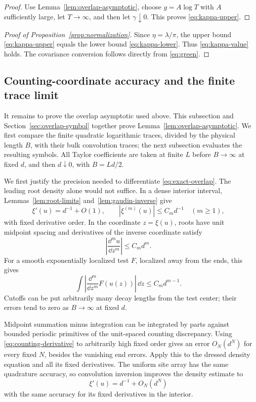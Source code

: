 \begin{proof}
Use Lemma~\ref{lem:overlap-asymptotic}, choose
\(g=A\log T\) with \(A\) sufficiently large, let \(T\to\infty\), and
then let \(\gamma\downarrow0\). This proves
\eqref{eq:kappa-upper}.
\end{proof}

\begin{proof}[Proof of Proposition~\ref{prop:normalization}]
Since \(\eta=\lambda/\pi\), the upper bound
\eqref{eq:kappa-upper} equals the lower bound
\eqref{eq:kappa-lower}. Thus \eqref{eq:kappa-value} holds.
The covariance conversion follows directly from \eqref{eq:green}.
\end{proof}

\subsection{Counting-coordinate accuracy and the finite trace limit}
\label{sec:finite-trace}

It remains to prove the overlap asymptotic used above. This subsection
and Section~\ref{sec:overlap-symbol} together prove
Lemma~\ref{lem:overlap-asymptotic}. We first compare the finite quadratic
logarithmic traces, divided by the physical length \(B\), with their bulk
convolution traces; the next subsection evaluates the resulting symbols.
All Taylor coefficients are taken at finite \(L\) before \(B\to\infty\)
at fixed \(d\), and then \(d\downarrow0\), with \(B=Ld/2\).

We first justify the precision needed to differentiate
\eqref{eq:exact-overlap}. The leading root density alone would not suffice.
In a dense interior interval, Lemmas~\ref{lem:root-limits}
and~\ref{lem:gaudin-inverse} give
\[
 \xi'(u)=d^{-1}+O(1),\qquad
 |\xi^{(m)}(u)|\le C_m d^{-1}\quad(m\ge1),
\]
with fixed derivative order. In the coordinate \(z=\xi(u)\), roots have
unit midpoint spacing and derivatives of the inverse coordinate satisfy
\[
 \left|\frac{\dd^m u}{\dd z^m}\right|\le C_m d^m.
\]
For a smooth exponentially localized test \(F\), localized away from the
ends, this gives
\begin{equation}\label{eq:counting-derivative}
 \int\left|
       \frac{\dd^m}{\dd z^m}F(u(z))\right|\,\dd z
       \le C_m d^{m-1}.
\end{equation}
Cutoffs can be put arbitrarily many decay lengths from the test center;
their errors tend to zero as \(B\to\infty\) at fixed \(d\).

Midpoint summation minus integration can be integrated by parts against
bounded periodic primitives of the unit-spaced counting discrepancy.
Using \eqref{eq:counting-derivative} to arbitrarily high fixed order gives
an error \(O_N(d^N)\) for every fixed \(N\), besides the vanishing
end errors. Apply this to the dressed density equation and all its
fixed derivatives. The uniform site array has the same quadrature
accuracy, so convolution inversion improves the density estimate to
\begin{equation}\label{eq:all-order-density}
 \xi'(u)=d^{-1}+O_N(d^N)
\end{equation}
with the same accuracy for its fixed derivatives in the interior.

